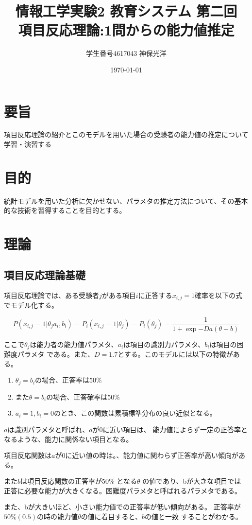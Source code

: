 \documentclass{jsarticle}
\title{情報工学実験2 教育システム 第二回\\
        項目反応理論:1問からの能力値推定}
\author{学生番号4617043 神保光洋}
\date{\today}
\begin{document}
\maketitle

\section{要旨}
  項目反応理論の紹介とこのモデルを用いた場合の受験者の能力値の推定について学習・演習する
\section{目的}
  統計モデルを用いた分析に欠かせない、パラメタの推定方法について、その基本的な技術を習得することを目的とする。
\section{理論}
\subsection{項目反応理論基礎}
項目反応理論では、ある受験者$j$がある項目$i$に正答する$x_{i, j} = 1$確率を以下の式でモデル化する。

$$
  P(x_{i, j} = 1 | {\theta}_{j} a_i, b_i) = P_i(x_{i, j} = 1 | {\theta}_j) = 
  P_i({\theta}_j) = \frac{1}{1 + \exp{-Da(\theta - b)}}
$$

ここで${\theta}_j$は能力者の能力値パラメタ、$a_i$は項目の識別力パラメタ、$b_i$は項目の困難度パラメタ
である。また、$D=1.7$とする。このモデルには以下の特徴がある。

\begin{enumerate}
  \item ${\theta}_j = b_i$の場合、正答率は$50\%$
  \item また${\theta}= b_i$の場合、正答確率は$50\%$
  \item $a_i = 1, b_i = 0$のとき、この関数は累積標準分布の良い近似となる。
\end{enumerate}


$a$は識別パラメタと呼ばれ、$a$が$0$に近い項目は、
能力値によらず一定の正答率となるような、能力に関係ない項目となる。

項目反応関数は$a$が0に近い値の時は。、能力値に関わらず正答率が高い傾向がある。

また$b$は項目反応関数の正答率が$50\%$ となる$\theta$ の値であり、bが大きな項目では
正答に必要な能力が大きくなる。困難度パラメタと呼ばれるパラメタである。

また、bが大きいほど、小さい能力値での正答率が低い傾向がある。
正答率が$50\%(0.5)$の時の能力値$\theta$の値に着目すると、$b$の値と一致
することがわかる。
\end{document}
